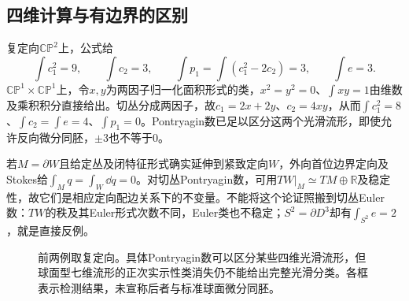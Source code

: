 \subsection{四维计算与有边界的区别}
复定向$\mathbb{CP}^2$上，公式给
\[
 \int c_1^2=9,\qquad \int c_2=3,\qquad
 \int p_1=\int(c_1^2-2c_2)=3,\qquad \int e=3.
\]
$\mathbb{CP}^1\times\mathbb{CP}^1$上，令$x,y$为两因子归一化面积形式的类，$x^2=y^2=0$、$\int xy=1$由维数及乘积积分直接给出。切丛分成两因子，故$c_1=2x+2y$、$c_2=4xy$，从而$\int c_1^2=8$、$\int c_2=\int e=4$、$\int p_1=0$。Pontryagin数已足以区分这两个光滑流形，即使允许反向微分同胚，$\pm3$也不等于0。

若$M=\partial W$且给定丛及闭特征形式确实延伸到紧致定向$W$，外向首位边界定向及Stokes给$\int_Mq=\int_W\dd q=0$。对切丛Pontryagin数，可用$TW|_M\simeq TM\oplus\mathbb R$及稳定性，故它们是相应定向配边关系下的不变量。不能将这个论证照搬到切丛Euler数：$TW$的秩及其Euler形式次数不同，Euler类也不稳定；$S^2=\partial D^3$却有$\int_{S^2}e=2$，就是直接反例。

\begin{figure}[htbp]
\centering
\caption{前两例取复定向。具体Pontryagin数可以区分某些四维光滑流形，但球面型七维流形的正次实示性类消失仍不能给出完整光滑分类。各框表示检测结果，未宣称后者与标准球面微分同胚。}
\label{fig:characteristic-limits}
\end{figure}
